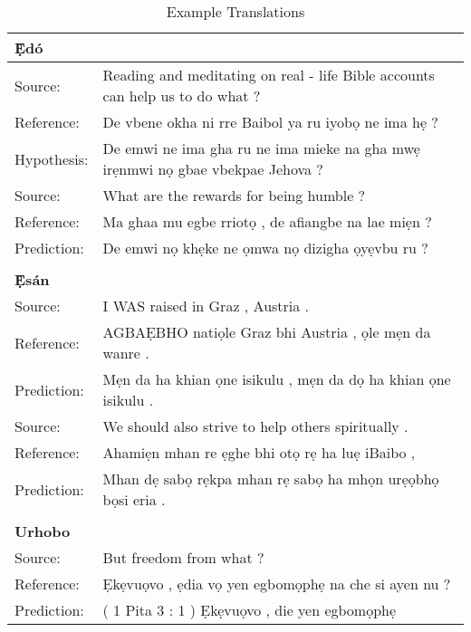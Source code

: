 \documentclass{article} %
\begin{document}
\begin{table}[h]
\caption{Example Translations}
\label{translations}
\begin{center}
  \begin{tabular}{ll}
     \textbf{\d{\`E}d{\'o}}  & \\
     \midrule
     \midrule
     Source:   &  Reading and meditating on real - life Bible accounts can help us to do what ?  \\
Reference: & De vbene okha ni rre Baibol ya ru iyob\d{o} ne ima h\d{e} ?  \\
Hypothesis: & De emwi ne ima gha ru ne ima mieke na gha mw\d{e} ir\d{e}nmwi n\d{o} gbae vbekpae Jehova ?  \\
     \midrule
	Source:   &    What are the rewards for being humble ? \\
	Reference:  &  Ma ghaa mu egbe rriot\d{o} , de afiangbe na lae mi\d{e}n ? \\
	Prediction:  & De emwi n\d{o} kh\d{e}ke ne \d{o}mwa n\d{o} dizigha \d{o}y\d{e}vbu ru ? \\
	 \bottomrule
     \\
    \textbf{\d{\`E}s{\'a}n}  & \\
     \midrule
     \midrule
	Source:      &  I WAS raised in Graz , Austria . \\
	Reference:    & AGBA\d{E}BHO nati\d{o}le Graz bhi Austria , \d{o}le m\d{e}n da wanre . \\
	Prediction:   & M\d{e}n da ha khian \d{o}ne isikulu , m\d{e}n da d\d{o} ha khian \d{o}ne isikulu . \\
     \midrule
     Source:    &   We should also strive to help others spiritually . \\
	 Reference:  &  Ahami\d{e}n mhan re \d{e}ghe bhi ot\d{o} r\d{e} ha lu\d{e} iBaibo , \\
	 Prediction:  &  Mhan d\d{e} sab\d{o} r\d{e}kpa mhan r\d{e} sab\d{o} ha mh\d{o}n ur\d{e}\d{o}bh\d{o} b\d{o}si eria . \\
	 \bottomrule
	\\
    \textbf{Urhobo}  & \\
     \midrule
     \midrule
	Source:    &                   But freedom from what ? \\
	Reference: &  		   Ẹk\d{e}vu\d{o}vo , \d{e}dia v\d{o} yen egbomọph\d{e} na che si ayen nu ? \\
	Prediction: & ( 1 Pita 3 : 1 ) Ẹk\d{e}vu\d{o}vo , die yen egbom\d{o}ph\d{e}  \\
     \midrule


\end{tabular}
\end{center}
\end{table}
\end{document}
